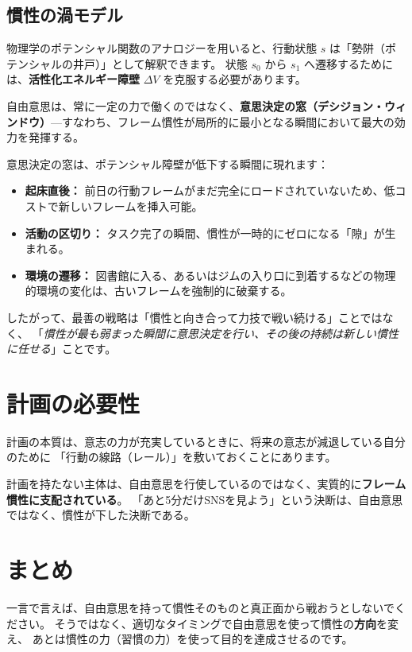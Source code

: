 \subsection{慣性の渦モデル}

物理学のポテンシャル関数のアナロジーを用いると、行動状態 $s$ は「勢阱（ポテンシャルの井戸）」として解釈できます。
状態 $s_0$ から $s_1$ へ遷移するためには、\textbf{活性化エネルギー障壁} $\Delta V$ を克服する必要があります。

\begin{theorem}[自由意思の最大レバレッジ]\label{thm:leverage}
自由意思は、常に一定の力で働くのではなく、\textbf{意思決定の窓（デシジョン・ウィンドウ）}---すなわち、フレーム慣性が局所的に最小となる瞬間において最大の効力を発揮する。
\end{theorem}

\begin{discussion}
意思決定の窓は、ポテンシャル障壁が低下する瞬間に現れます：
\begin{itemize}[nosep]
  \item \textbf{起床直後：} 前日の行動フレームがまだ完全にロードされていないため、低コストで新しいフレームを挿入可能。
  \item \textbf{活動の区切り：} タスク完了の瞬間、慣性が一時的にゼロになる「隙」が生まれる。
  \item \textbf{環境の遷移：} 図書館に入る、あるいはジムの入り口に到着するなどの物理的環境の変化は、古いフレームを強制的に破棄する。
\end{itemize}
したがって、最善の戦略は「慣性と向き合って力技で戦い続ける」ことではなく、
「\emph{慣性が最も弱まった瞬間に意思決定を行い、その後の持続は新しい慣性に任せる}」ことです。
\end{discussion}

\section{計画の必要性}\label{sec:planning}

計画の本質は、意志の力が充実しているときに、将来の意志が減退している自分のために
「行動の線路（レール）」を敷いておくことにあります。

\begin{corollary}[無計画な主体は自由ではない]\label{cor:unfree}
計画を持たない主体は、自由意思を行使しているのではなく、実質的に\textbf{フレーム慣性に支配されている}。
「あと5分だけSNSを見よう」という決断は、自由意思ではなく、慣性が下した決断である。
\end{corollary}

\section{まとめ}\label{sec:summary}

\begin{insightbox}
一言で言えば、自由意思を持って慣性そのものと真正面から戦おうとしないでください。
そうではなく、適切なタイミングで自由意思を使って慣性の\textbf{方向}を変え、
あとは慣性の力（習慣の力）を使って目的を達成させるのです。
\end{insightbox}
